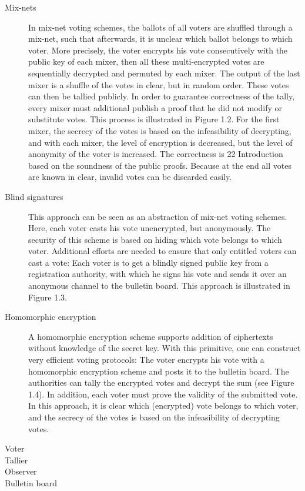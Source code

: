 \begin{description}
    \item[Mix-nets] In mix-net voting schemes, the ballots of all voters are shuffled through a
        mix-net, such that afterwards, it is unclear which ballot belongs to which
        voter. More precisely, the voter encrypts his vote consecutively with the
        public key of each mixer, then all these multi-encrypted votes are sequentially
        decrypted and permuted by each mixer. The output of the
        last mixer is a shuffle of the votes in clear, but in random order. These
        votes can then be tallied publicly. In order to guarantee correctness of the
        tally, every mixer must additional publish a proof that he did not modify
        or substitute votes. This process is illustrated in Figure 1.2.
        For the first mixer, the secrecy of the votes is based on the infeasibility
        of decrypting, and with each mixer, the level of encryption is decreased,
        but the level of anonymity of the voter is increased. The correctness is
        22 Introduction
        based on the soundness of the public proofs. Because at the end all votes
        are known in clear, invalid votes can be discarded easily.
    
    
    \item[Blind signatures] This approach can be seen as an abstraction of mix-net voting            schemes. Here, each voter casts his vote unencrypted, but anonymously. The security
        of this scheme is based on hiding which vote belongs to which voter.
        Additional efforts are needed to ensure that only entitled voters can cast
        a vote: Each voter is to get a blindly signed public key from a registration
        authority, with which he signs his vote and sends it over an anonymous
        channel to the bulletin board. This approach is illustrated in Figure 1.3.
        
        
    \item[Homomorphic encryption] A homomorphic encryption scheme supports addition of               ciphertexts without knowledge of the secret key. With this primitive, one can construct
        very efficient voting protocols: The voter encrypts his vote with a
        homomorphic encryption scheme and posts it to the bulletin board. The
        authorities can tally the encrypted votes and decrypt the sum (see Figure
        1.4). In addition, each voter must prove the validity of the submitted
        vote. In this approach, it is clear which (encrypted) vote belongs to which
        voter, and the secrecy of the votes is based on the infeasibility of decrypting
        votes.
\end{description}


\begin{description}
    \item[Voter]
    \item[Tallier]
    \item[Observer]
    \item[Bulletin board]
\end{description}